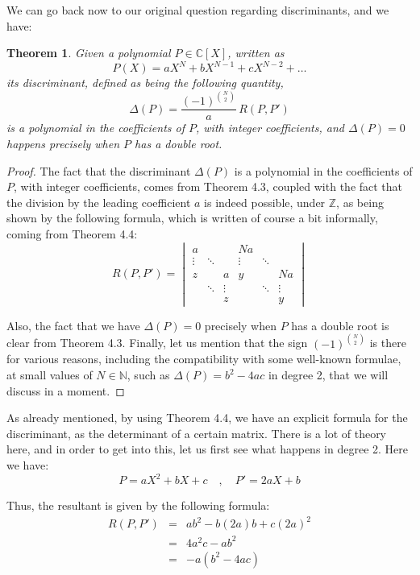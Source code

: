 \documentclass[12pt]{amsbook}
\newtheorem{theorem}{Theorem}[chapter]
\begin{document}
We can go back now to our original question regarding discriminants, and we have:


\begin{theorem}
Given a polynomial $P\in\mathbb C[X]$, written as
$$P(X)=aX^N+bX^{N-1}+cX^{N-2}+\ldots$$
its discriminant, defined as being the following quantity,
$$\Delta(P)=\frac{(-1)^{\binom{N}{2}}}{a}\,R(P,P')$$
is a polynomial in the coefficients of $P$, with integer coefficients, and $\Delta(P)=0$ happens precisely when $P$ has a double root.
\end{theorem}

\begin{proof}
The fact that the discriminant $\Delta(P)$ is a polynomial in the coefficients of $P$, with integer coefficients, comes from Theorem 4.3, coupled with the fact that the division by the leading coefficient $a$ is indeed possible, under $\mathbb Z$, as being shown by the following formula, which is written of course a bit informally, coming from Theorem 4.4:
$$R(P,P')=
\begin{vmatrix}
a&&&Na\\
\vdots&\ddots&&\vdots&\ddots\\
z&&a&y&&Na\\
&\ddots&\vdots&&\ddots&\vdots\\
&&z&&&y
\end{vmatrix}
$$

Also, the fact that we have $\Delta(P)=0$ precisely when $P$ has a double root is clear from Theorem 4.3. Finally, let us mention that the sign $(-1)^{\binom{N}{2}}$ is there for various reasons, including the compatibility with some well-known formulae, at small values of $N\in\mathbb N$, such as $\Delta(P)=b^2-4ac$ in degree 2, that we will discuss in a moment.
\end{proof}

As already mentioned, by using Theorem 4.4, we have an explicit formula for the discriminant, as the determinant of a certain matrix. There is a lot of theory here, and in order to get into this, let us first see what happens in degree 2. Here we have:
$$P=aX^2+bX+c\quad,\quad 
P'=2aX+b$$

Thus, the resultant is given by the following formula:
\begin{eqnarray*}
R(P,P')
&=&ab^2-b(2a)b+c(2a)^2\\
&=&4a^2c-ab^2\\
&=&-a(b^2-4ac)
\end{eqnarray*}
\end{document}
